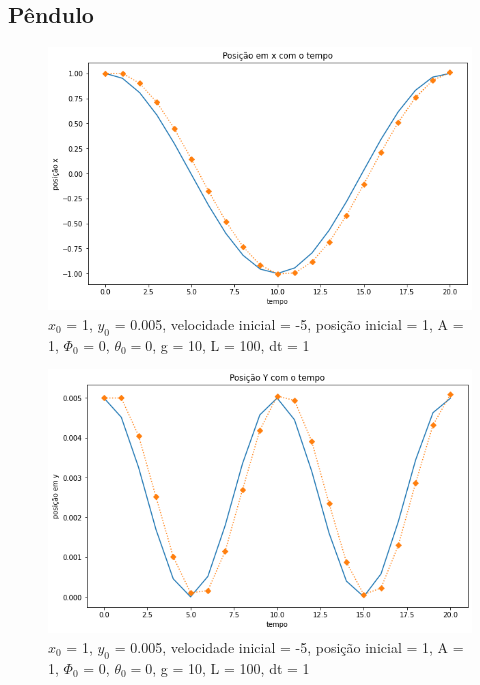 \documentclass[12pt]{article}
\begin{document}
\subsection{Pêndulo}
\begin{figure}[H]
  \centering
  \includegraphics[scale = 0.6]{imagens/(pendulo)dt=1tf=20posicaox.png}
  \caption{$x_0$ = 1, $y_0$ = 0.005, velocidade inicial = -5, posição inicial = 1, A = 1, $\Phi_0$ = 0, $\theta_0 = 0$, g = 10, L = 100, dt = 1}
\end{figure}
\begin{figure}[H]
  \centering
  \includegraphics[scale = 0.6]{imagens/(pendulo)dt=1tf=20posicaoy.png}
  \caption{$x_0$ = 1, $y_0$ = 0.005, velocidade inicial = -5, posição inicial = 1, A = 1, $\Phi_0$ = 0, $\theta_0 = 0$, g = 10, L = 100, dt = 1}
\end{figure}
\end{document}
